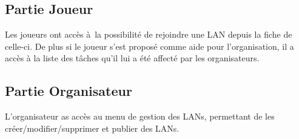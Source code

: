 \documentclass[12pt]{article}
\begin{document}
\subsection{Partie Joueur}

Les joueurs ont accès à la possibilité de rejoindre une LAN depuis la fiche de celle-ci. De plus si le joueur s'est proposé comme aide pour l'organisation, il a accès à la liste des tâches qu'il lui a été affecté par les organisateurs.

\subsection{Partie Organisateur}

L'organisateur as accès au menu de gestion des LANs, permettant de les créer/modifier/supprimer et publier des LANs. 
\end{document}
